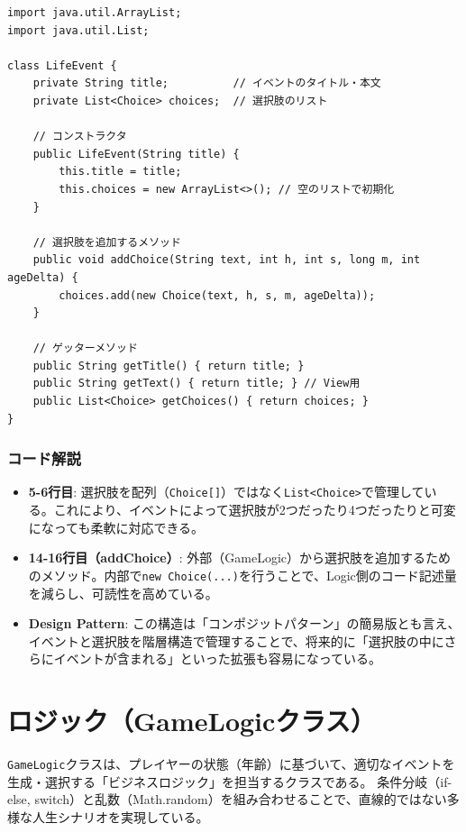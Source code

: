 \documentclass[a4paper,11pt]{jsarticle}
\begin{document}
\begin{lstlisting}[caption=LifeEvent.java, label=code:lifeevent]
import java.util.ArrayList;
import java.util.List;

class LifeEvent {
    private String title;          // イベントのタイトル・本文
    private List<Choice> choices;  // 選択肢のリスト

    // コンストラクタ
    public LifeEvent(String title) {
        this.title = title;
        this.choices = new ArrayList<>(); // 空のリストで初期化
    }

    // 選択肢を追加するメソッド
    public void addChoice(String text, int h, int s, long m, int ageDelta) {
        choices.add(new Choice(text, h, s, m, ageDelta));
    }

    // ゲッターメソッド
    public String getTitle() { return title; }
    public String getText() { return title; } // View用
    public List<Choice> getChoices() { return choices; }
}
\end{lstlisting}

\subsubsection*{コード解説}
\begin{itemize}
    \item \textbf{5-6行目}: 選択肢を配列（\texttt{Choice[]}）ではなく\texttt{List<Choice>}で管理している。これにより、イベントによって選択肢が2つだったり4つだったりと可変になっても柔軟に対応できる。
    \item \textbf{14-16行目（addChoice）}: 外部（GameLogic）から選択肢を追加するためのメソッド。内部で\texttt{new Choice(...)}を行うことで、Logic側のコード記述量を減らし、可読性を高めている。
    \item \textbf{Design Pattern}: この構造は「コンポジットパターン」の簡易版とも言え、イベントと選択肢を階層構造で管理することで、将来的に「選択肢の中にさらにイベントが含まれる」といった拡張も容易になっている。
\end{itemize}



\section{ロジック（GameLogicクラス）}
\texttt{GameLogic}クラスは、プレイヤーの状態（年齢）に基づいて、適切なイベントを生成・選択する「ビジネスロジック」を担当するクラスである。
条件分岐（if-else, switch）と乱数（Math.random）を組み合わせることで、直線的ではない多様な人生シナリオを実現している。
\end{document}
